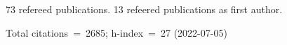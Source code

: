 73 refereed publications. 13 refeered publications as first author.

Total citations~=~2685; h-index~=~27 (2022-07-05)